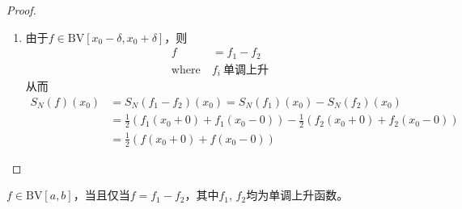 \begin{proof}
\begin{enumerate}[leftmargin=1cm, label=\arabic*]
\begin{proof}
            \begin{align*}
                I \underset{\text{积分第二中值定理}}{\Longrightarrow}\ \eqnmark[red]{b1}{\left(g(\delta) - g(0)\right)} \eqnmark[blue]{b2}{\int\limits_{\xi}^{\delta} \frac{\sin\pi t(2N+1)}{\sin \pi t} dt}
            \end{align*}
            其中
            \begin{align*}
                \int\limits_{\xi}^{\delta} \frac{\sin\pi t(2N+1)}{\sin \pi t} dt & = \int_{\xi}^{\delta} \sin(\pi t(2N+1)) \left(\frac{1}{\sin(\pi t)} - \frac{1}{\pi t} \right) dt + \frac{1}{\pi} \int\limits_{\xi}^{\delta} \frac{\sin(\pi t(2N+1))}{\pi t(2N+1)} dt(2N+1) \\
                \frac{1}{\pi} \left|\int\limits_a^b \frac{\sin u}{u} du \right| &\leqslant \frac{6}{\pi} \\
                \left|\frac{1}{\pi t} - \frac{1}{\sin \pi t}\right| & = \frac{|\sin(\pi t) - \pi t|}{|(\pi t) - \sin(\pi t)|} \leqslant \frac{\frac{1}{2} (\pi t)^2}{(\pi t)\sin(\pi t)} \leqslant \frac{\pi}{4}
            \end{align*}

            而若$g(t)$单调下降，则考虑$-g(t)$是单调上升的，从而对单调函数均可满足。
        \end{proof}

        若断言成立，则
        \begin{align*}
            \lim\limits_{N\to\infty}\int\limits_0^{\frac{1}{2}} f(x_0-t) D_N(t) dt &= \frac{1}{2} f(x_0-) \\
            \lim\limits_{N\to\infty}\int\limits_0^{\frac{1}{2}} f(x_0+t) D_N(t) dt &= \frac{1}{2} f(x_0+)
        \end{align*}

        \item 由于$f\in\text{BV}[x_0-\delta,x_0+\delta]$，则
        \begin{align*}
            f &= f_1 - f_2 \\
            \text{where}\ & f_i\ \text{单调上升}
        \end{align*}
        从而
        \begin{align*}
            S_N(f)(x_0) &= S_N(f_1 - f_2)(x_0) = S_N(f_1)(x_0) - S_N(f_2)(x_0) \\
            & = \frac{1}{2}(f_1(x_0+0) + f_1(x_0-0)) - \frac{1}{2}(f_2(x_0+0) + f_2(x_0-0)) \\
            & = \frac{1}{2}(f(x_0+0) + f(x_0-0))
        \end{align*}
    \end{enumerate}
\end{proof}
\begin{remark}
    $f\in \text{BV}[a,b]$，当且仅当$f = f_1 - f_2$，其中$f_1$, $f_2$均为单调上升函数。
\end{remark}

